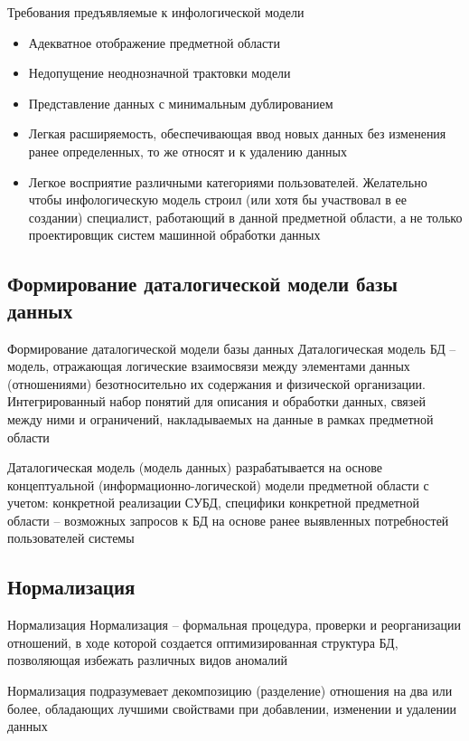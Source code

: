 \documentclass[12pt]{article}
\begin{document}
\begin{nota}{Требования предъявляемые к инфологической модели}
    \begin{itemize}
        \item Адекватное отображение предметной области 
        \item Недопущение неоднозначной трактовки модели 
        \item Представление данных с минимальным дублированием 
        \item Легкая расширяемость, обеспечивающая ввод новых данных без изменения ранее определенных, то же относят и к удалению данных 
        \item Легкое восприятие различными категориями пользователей. Желательно чтобы инфологическую модель строил (или хотя бы участвовал в ее создании) специалист, работающий в данной предметной области, а не только проектировщик систем машинной обработки данных 
    \end{itemize}
\end{nota}

\newpage 

\subsection{Формирование даталогической модели базы данных}

\begin{defin}{Формирование даталогической модели базы данных}
    Даталогическая модель БД -- модель, отражающая логические взаимосвязи между элементами данных (отношениями) безотносительно их содержания и физической организации. Интегрированный набор понятий для описания и обработки данных, связей между ними и ограничений, накладываемых на данные в рамках предметной области 

    Даталогическая модель (модель данных) разрабатывается на основе концептуальной (информационно-логической) модели предметной области с учетом: конкретной реализации СУБД, специфики конкретной предметной области -- возможных запросов к БД на основе ранее выявленных потребностей пользователей системы 
\end{defin}

\newpage 

\subsection{Нормализация}

\begin{defin}{Нормализация}
    Нормализация -- формальная процедура, проверки и реорганизации отношений, в ходе которой создается оптимизированная структура БД, позволяющая избежать различных видов аномалий 

    Нормализация подразумевает декомпозицию (разделение) отношения на два или более, обладающих лучшими свойствами при добавлении, изменении и удалении данных
\end{defin}
\end{document}
